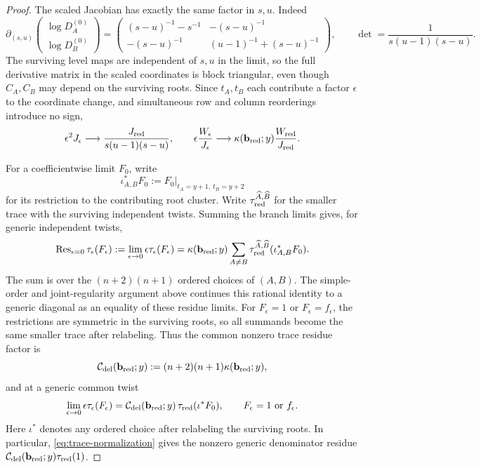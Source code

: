 \begin{proof}
The scaled Jacobian has exactly the same factor in \(s,u\). Indeed
\[
 \partial_{(s,u)}\begin{pmatrix}\log D_A^{(0)}\\ \log D_B^{(0)}\end{pmatrix}
 =\begin{pmatrix}
  (s-u)^{-1}-s^{-1} & -(s-u)^{-1}\\
  -(s-u)^{-1} & (u-1)^{-1}+(s-u)^{-1}
 \end{pmatrix},
 \qquad
 \det=\frac1{s(u-1)(s-u)}.
\]
The surviving level maps are independent of \(s,u\) in the limit, so the full derivative matrix in the scaled coordinates is block triangular, even though \(C_A,C_B\) may depend on the surviving roots. Since \(t_A,t_B\) each contribute a factor \(\epsilon\) to the coordinate change, and simultaneous row and column reorderings introduce no sign,
\[
 \epsilon^2J_\epsilon\longrightarrow
 \frac{J_{\rm red}}{s(u-1)(s-u)},
 \qquad
 \epsilon\frac{W_\epsilon}{J_\epsilon}\longrightarrow
 \kappa(\mathbf b_{\rm red};y)\frac{W_{\rm red}}{J_{\rm red}}.
\]

For a coefficientwise limit \(F_0\), write
\[
 \iota_{A,B}^*F_0:=
 \left.F_0\right|_{t_A=y+1,\ t_B=y+2}
\]
for its restriction to the contributing root cluster. Write \(\tau_{\rm red}^{\widehat A,\widehat B}\) for the smaller trace with the surviving independent twists. Summing the branch limits gives, for generic independent twists,
\[
 \operatorname{Res}_{\epsilon=0}\tau_\epsilon(F_\epsilon)
 :=\lim_{\epsilon\to0}\epsilon\tau_\epsilon(F_\epsilon)
 =\kappa(\mathbf b_{\rm red};y)
  \sum_{A\ne B}\tau_{\rm red}^{\widehat A,\widehat B}
                   (\iota_{A,B}^*F_0).
\]
The sum is over the \((n+2)(n+1)\) ordered choices of \((A,B)\). The simple-order and joint-regularity argument above continues this rational identity to a generic diagonal as an equality of these residue limits. For \(F_\epsilon=1\) or \(F_\epsilon=f_\epsilon\), the restrictions are symmetric in the surviving roots, so all summands become the same smaller trace after relabeling. Thus the common nonzero trace residue factor is
\[
 \mathcal C_{\rm del}(\mathbf b_{\rm red};y)
 :=(n+2)(n+1)\kappa(\mathbf b_{\rm red};y),
\]
and at a generic common twist
\begin{equation}\label{eq:scalar-fusion-residue}
 \lim_{\epsilon\to0}\epsilon\tau_\epsilon(F_\epsilon)
 =\mathcal C_{\rm del}(\mathbf b_{\rm red};y)\,
   \tau_{\rm red}(\iota^*F_0),
 \qquad F_\epsilon=1\ \text{or}\ f_\epsilon.
\end{equation}
Here \(\iota^*\) denotes any ordered choice after relabeling the surviving roots. In particular, \eqref{eq:trace-normalization} gives the nonzero generic denominator residue
\(\mathcal C_{\rm del}(\mathbf b_{\rm red};y)\tau_{\rm red}(1)\).



\end{proof}
